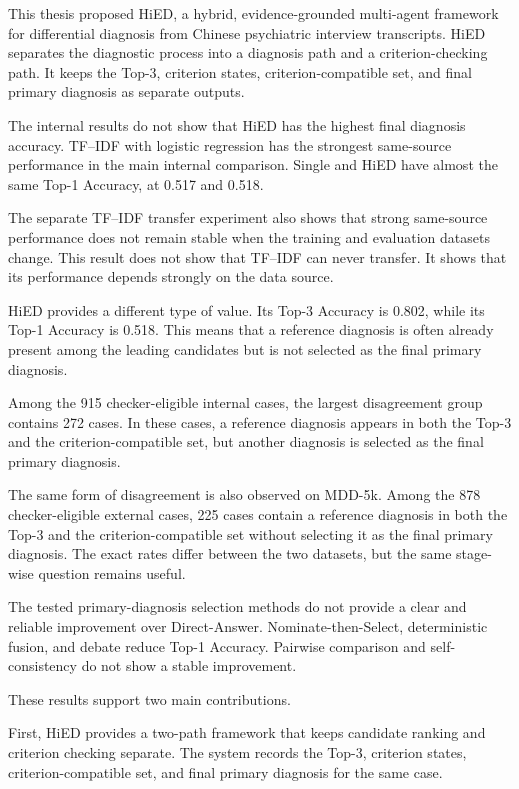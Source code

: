 \documentclass[12pt,a4paper,oneside]{report}
\begin{document}
This thesis proposed HiED, a hybrid, evidence-grounded multi-agent
framework for differential diagnosis from Chinese psychiatric interview
transcripts. HiED separates the diagnostic process into a diagnosis path
and a criterion-checking path. It keeps the Top-3, criterion states,
criterion-compatible set, and final primary diagnosis as separate
outputs.

The internal results do not show that HiED has the highest final
diagnosis accuracy. TF--IDF with logistic regression has the strongest
same-source performance in the main internal comparison. Single and HiED
have almost the same Top-1 Accuracy, at 0.517 and 0.518.

The separate TF--IDF transfer experiment also shows that strong
same-source performance does not remain stable when the training and
evaluation datasets change. This result does not show that TF--IDF can
never transfer. It shows that its performance depends strongly on the
data source.

HiED provides a different type of value. Its Top-3 Accuracy is 0.802,
while its Top-1 Accuracy is 0.518. This means that a reference diagnosis
is often already present among the leading candidates but is not selected
as the final primary diagnosis.

Among the 915 checker-eligible internal cases, the largest disagreement
group contains 272 cases. In these cases, a reference diagnosis appears
in both the Top-3 and the criterion-compatible set, but another diagnosis
is selected as the final primary diagnosis.

The same form of disagreement is also observed on MDD-5k. Among the 878
checker-eligible external cases, 225 cases contain a reference diagnosis
in both the Top-3 and the criterion-compatible set without selecting it
as the final primary diagnosis. The exact rates differ between the two
datasets, but the same stage-wise question remains useful.

The tested primary-diagnosis selection methods do not provide a clear
and reliable improvement over Direct-Answer. Nominate-then-Select,
deterministic fusion, and debate reduce Top-1 Accuracy. Pairwise
comparison and self-consistency do not show a stable improvement.

These results support two main contributions.

First, HiED provides a two-path framework that keeps candidate ranking
and criterion checking separate. The system records the Top-3,
criterion states, criterion-compatible set, and final primary diagnosis
for the same case.
\end{document}
